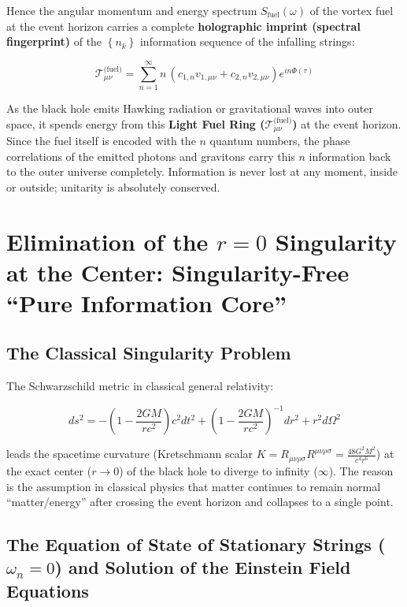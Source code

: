 \documentclass[12pt,a4paper]{article}
\begin{document}
Hence the angular momentum and energy spectrum $S_{\text{fuel}}(\omega)$ of the vortex fuel at the event horizon carries a complete \textbf{holographic imprint (spectral fingerprint)} of the $\left\{n_k\right\}$ information sequence of the infalling strings:

\begin{equation}
\mathcal{T}_{\mu\nu}^{\text{(fuel)}} = \sum_{n=1}^{\infty} n \, \left( c_{1,n} v_{1,\mu\nu} + c_{2,n} v_{2,\mu\nu} \right) e^{i n \Phi(\tau)}
\end{equation}

As the black hole emits Hawking radiation or gravitational waves into outer space, it spends energy from this \textbf{Light Fuel Ring ($\mathcal{T}_{\mu\nu}^{\text{(fuel)}}$)} at the event horizon. Since the fuel itself is encoded with the $n$ quantum numbers, the phase correlations of the emitted photons and gravitons carry this $n$ information back to the outer universe completely. Information is never lost at any moment, inside or outside; unitarity is absolutely conserved.

\section{Elimination of the $r=0$ Singularity at the Center: Singularity-Free ``Pure Information Core''}

\subsection{The Classical Singularity Problem}

The Schwarzschild metric in classical general relativity:

\begin{equation}
ds^2 = -\left(1 - \frac{2GM}{rc^2}\right) c^2 dt^2 + \left(1 - \frac{2GM}{rc^2}\right)^{-1} dr^2 + r^2 d\Omega^2
\end{equation}

leads the spacetime curvature (Kretschmann scalar $K = R_{\mu\nu\rho\sigma}R^{\mu\nu\rho\sigma} = \frac{48 G^2 M^2}{c^4 r^6}$) at the exact center ($r \to 0$) of the black hole to diverge to infinity ($\infty$). The reason is the assumption in classical physics that matter continues to remain normal ``matter/energy'' after crossing the event horizon and collapses to a single point.

\subsection{The Equation of State of Stationary Strings ($\omega_n = 0$) and Solution of the Einstein Field Equations}
\end{document}
